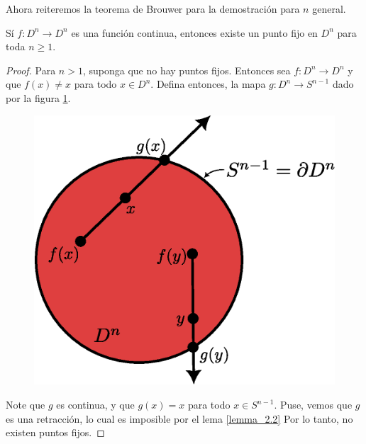 Ahora reiteremos la teorema de Brouwer para la demostraci\'on para $n$ general.

\begin{theorem}
    S\'i $f:D^n \rightarrow D^n$ es una funci\'on continua, entonces existe un
    punto fijo en $D^n$ para toda $n \geq 1$.
\end{theorem}
\begin{proof}
    Para $n>1$, suponga que no hay puntos fijos. Entonces sea $f:D^n \rightarrow
    D^n$ y que $f(x) \neq x$ para todo $x \in D^n$. Defina entonces, la mapa
    $g:D^n \rightarrow S^{n-1}$ dado por la figura \ref{fig_5}.
    \begin{figure}[h]
        \centering
        \includegraphics[scale=0.5]{Figures/brouwer_thm_2.eps}
        \caption{}
        \label{fig_5}
    \end{figure}
    Note que $g$ es continua, y que  $g(x)=x$ para todo $x \in S^{n-1}$. Puse,
    vemos que $g$ es una retracci\'on, lo cual es imposible por el lema
    \ref{lemma_2.2} Por lo tanto, no existen puntos fijos.
\end{proof}
